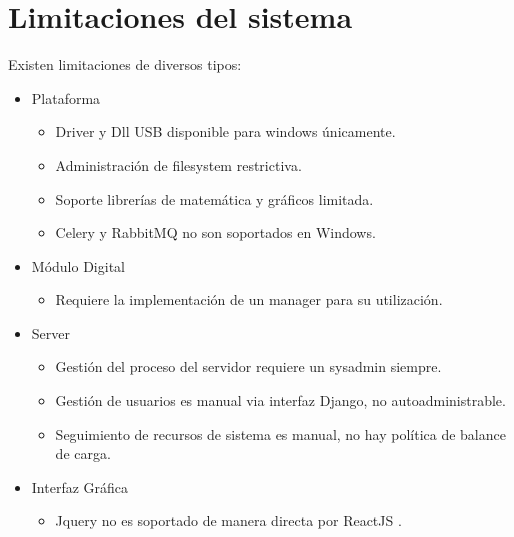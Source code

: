 \section{Limitaciones del sistema}

Existen limitaciones de diversos tipos:

\begin{itemize}
    \item Plataforma
    \begin{itemize}
    \item Driver y Dll USB disponible para windows \'unicamente.
    \item Administraci\'on de filesystem restrictiva. 
    \item Soporte librer\'ias de matem\'atica y gr\'aficos limitada.
    \item Celery y RabbitMQ no son soportados en Windows.\cite{celery} 
    \end{itemize}
    \item M\'odulo Digital
    \begin{itemize}
        \item Requiere la implementaci\'on de un manager para su utilizaci\'on.
    \end{itemize}
    \item Server
    \begin{itemize}
        \item Gesti\'on del proceso del servidor requiere un sysadmin siempre.
        \item Gesti\'on de usuarios es manual via interfaz Django, no autoadministrable.
        \item Seguimiento de recursos de sistema es manual, no hay pol\'itica de balance de carga.
    \end{itemize}
    \item Interfaz Gr\'afica
    \begin{itemize} 
        \item Jquery no es soportado de manera directa por ReactJS\cite{react_jquery} .
    \end{itemize}
\end{itemize}
\newpage
